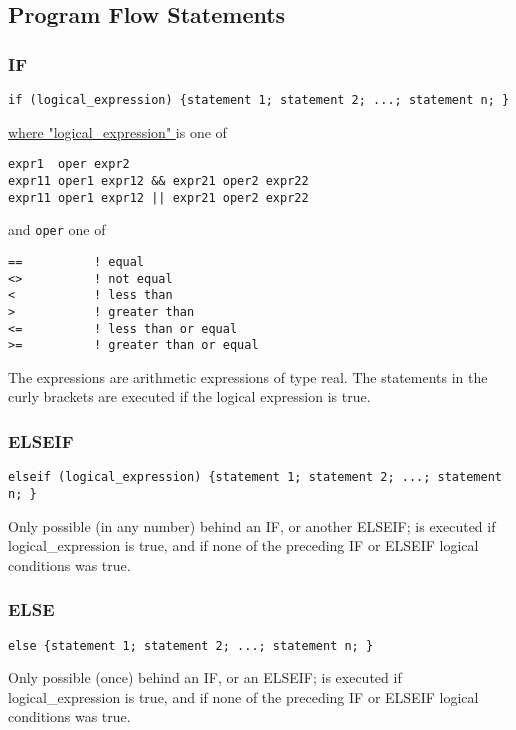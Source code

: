 
\subsection{Program Flow Statements}

\subsubsection{ IF }
\begin{verbatim}
if (logical_expression) {statement 1; statement 2; ...; statement n; }
\end{verbatim}
\href{logical}{where "logical\_expression" } is one of 
\begin{verbatim}
expr1  oper expr2
expr11 oper1 expr12 && expr21 oper2 expr22
expr11 oper1 expr12 || expr21 oper2 expr22
\end{verbatim} 
and \verb+oper+ one of 
\begin{verbatim}
==          ! equal
<>          ! not equal
<           ! less than
>           ! greater than
<=          ! less than or equal
>=          ! greater than or equal
\end{verbatim} 
The expressions are arithmetic expressions of type real. The statements
in the curly brackets are executed if the logical expression is true.  


\subsubsection{ ELSEIF }%
\begin{verbatim}
elseif (logical_expression) {statement 1; statement 2; ...; statement n; }
\end{verbatim} 
Only possible (in any number) behind an IF, or another ELSEIF; is
executed if  logical\_expression is true, and if none of the preceding
IF or ELSEIF logical conditions was true.  


\subsubsection{ ELSE }%
\begin{verbatim}
else {statement 1; statement 2; ...; statement n; }
\end{verbatim} 
Only possible (once) behind an IF, or an ELSEIF; is executed if
logical\_expression is true, and if none of the preceding IF or ELSEIF
logical conditions was true.  

